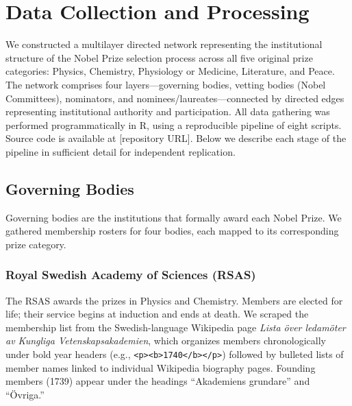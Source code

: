 
\section{Data Collection and Processing}\label{sec:data}

We constructed a multilayer directed network representing the institutional
structure of the Nobel Prize selection process across all five original prize
categories: Physics, Chemistry, Physiology or Medicine, Literature, and Peace.
The network comprises four layers---governing bodies, vetting bodies
(Nobel Committees), nominators, and nominees/laureates---connected by directed
edges representing institutional authority and participation. All data
gathering was performed programmatically in R, using a reproducible pipeline
of eight scripts. Source code is available at [repository URL]. Below we
describe each stage of the pipeline in sufficient detail for independent
replication.

\subsection{Governing Bodies}\label{sec:governing}

Governing bodies are the institutions that formally award each Nobel Prize.
We gathered membership rosters for four bodies, each mapped to its
corresponding prize category.

\subsubsection{Royal Swedish Academy of Sciences (RSAS)}

The RSAS awards the prizes in Physics and Chemistry. Members are elected for
life; their service begins at induction and ends at death. We scraped the
membership list from the Swedish-language Wikipedia page
\emph{Lista \"over ledam\"oter av Kungliga Vetenskapsakademien}, which
organizes members chronologically under bold year headers (e.g.,
\texttt{<p><b>1740</b></p>}) followed by bulleted lists of member names
linked to individual Wikipedia biography pages. Founding members (1739)
appear under the headings ``Akademiens grundare'' and ``\"Ovriga.''


